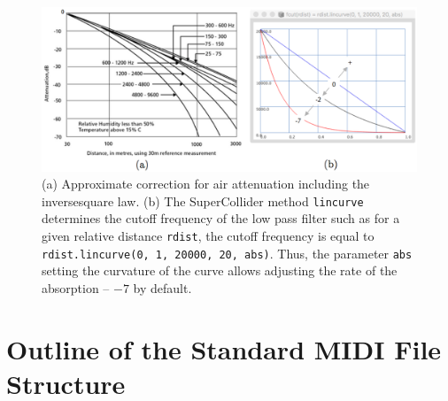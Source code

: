 \documentclass{book}
\begin{document}
\begin{figure}[H]
\begin{center}
\includegraphics[width=\textwidth]{img/6785}
\caption[]{(a) \citep{bk} Approximate correction for air attenuation including the inversesquare law. (b) The SuperCollider method \texttt{lincurve} determines the cutoff frequency of the low pass filter such as for a given relative distance \texttt{rdist}, the cutoff frequency is equal to \texttt{rdist.lincurve(0, 1, 20000, 20, abs)}. Thus, the parameter \texttt{abs} setting the curvature of the curve allows adjusting the rate of the absorption -- $-7$ by default. 
}
\label{fig:fcut}
\end{center}
\end{figure}






\chapter*{\Large Outline of the Standard MIDI File Structure}
\label{infomidi}

\end{document}
